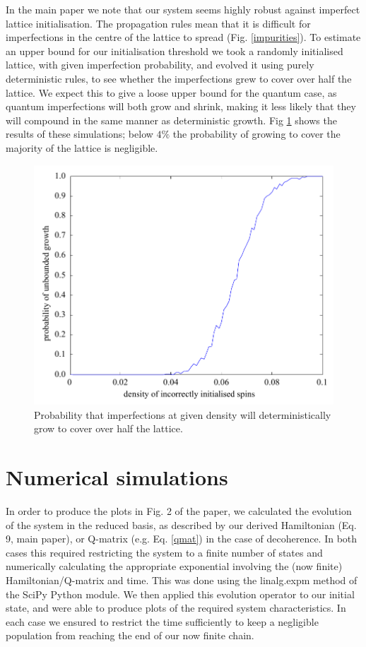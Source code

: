  In the main paper we note that our system seems highly robust against imperfect lattice initialisation. The propagation rules mean that it is difficult for imperfections in the centre of the lattice to spread (Fig. \ref{impurities}). To estimate an upper bound for our initialisation threshold we took a randomly initialised lattice, with given imperfection probability, and evolved it using purely deterministic rules, to see whether the imperfections grew to cover over half the lattice. We expect this to give a loose upper bound for the quantum case, as quantum imperfections will both grow and shrink, making it less likely that they will compound in the same manner as deterministic growth. Fig \ref{flipthreshold} shows the results of these simulations; below $4\%$ the probability of growing to cover the majority of the lattice is negligible.

\begin{figure}[!h]
  \begin{center}
\includegraphics[scale=0.5]{assets/flipthreshold.pdf}
\end{center}
\caption{Probability that imperfections at given density will deterministically grow to cover over half the lattice.}
\label{flipthreshold}
\end{figure}

\section{Numerical simulations}

In order to produce the plots in Fig. 2 of the paper, we calculated
the evolution of the system in the reduced basis, as described by our
derived Hamiltonian (Eq. 9, main paper), or Q-matrix (e.g. Eq. \ref{qmat}) in the case of decoherence. In both
cases this required restricting the system to a finite number of
states and numerically calculating the appropriate exponential
involving the (now finite) Hamiltonian/Q-matrix and time. This was
done using the linalg.expm method of the SciPy Python module. We then
applied this evolution operator to our initial state, and were able to
produce plots of the required system characteristics. In each case we
ensured to restrict the time sufficiently to keep a negligible
population from reaching the end of our now finite chain.

